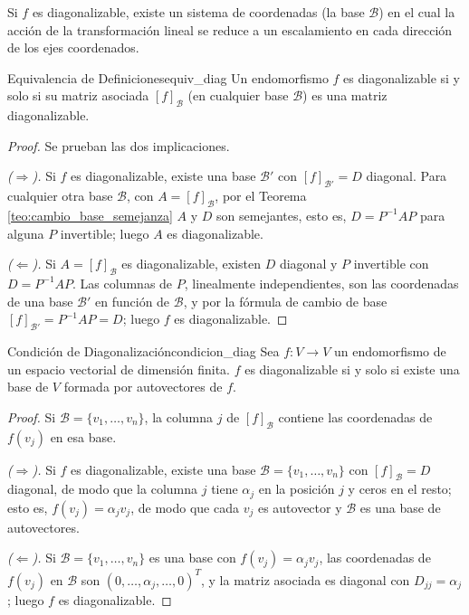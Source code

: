 \documentclass[11pt, a4paper]{article}
\begin{document}
\obs Si $f$ es diagonalizable, existe un sistema de coordenadas (la base $\mathcal{B}$) en el cual la acción de la transformación lineal se reduce a un escalamiento en cada dirección de los ejes coordenados.

\begin{proposicion}{Equivalencia de Definiciones}{equiv_diag}
Un endomorfismo $f$ es diagonalizable si y solo si su matriz asociada $[f]_\mathcal{B}$ (en cualquier base $\mathcal{B}$) es una matriz diagonalizable.
\end{proposicion}

\begin{proof}
Se prueban las dos implicaciones.

\textit{($\Rightarrow$).} Si $f$ es diagonalizable, existe una base $\mathcal{B}'$ con $[f]_{\mathcal{B}'} = D$ diagonal. Para cualquier otra base $\mathcal{B}$, con $A = [f]_\mathcal{B}$, por el Teorema \ref{teo:cambio_base_semejanza} $A$ y $D$ son semejantes, esto es, $D = P^{-1} A P$ para alguna $P$ invertible; luego $A$ es diagonalizable.

\textit{($\Leftarrow$).} Si $A = [f]_\mathcal{B}$ es diagonalizable, existen $D$ diagonal y $P$ invertible con $D = P^{-1} A P$. Las columnas de $P$, linealmente independientes, son las coordenadas de una base $\mathcal{B}'$ en función de $\mathcal{B}$, y por la fórmula de cambio de base $[f]_{\mathcal{B}'} = P^{-1} A P = D$; luego $f$ es diagonalizable.
\end{proof}

\begin{teorema}{Condición de Diagonalización}{condicion_diag}
Sea $f: V \to V$ un endomorfismo de un espacio vectorial de dimensión finita.
$f$ es diagonalizable si y solo si existe una base de $V$ formada por autovectores de $f$.
\end{teorema}

\begin{proof}
Si $\mathcal{B} = \{v_1, \dots, v_n\}$, la columna $j$ de $[f]_\mathcal{B}$ contiene las coordenadas de $f(v_j)$ en esa base.

\textit{($\Rightarrow$).} Si $f$ es diagonalizable, existe una base $\mathcal{B} = \{v_1, \dots, v_n\}$ con $[f]_\mathcal{B} = D$ diagonal, de modo que la columna $j$ tiene $\alpha_j$ en la posición $j$ y ceros en el resto; esto es, $f(v_j) = \alpha_j v_j$, de modo que cada $v_j$ es autovector y $\mathcal{B}$ es una base de autovectores.

\textit{($\Leftarrow$).} Si $\mathcal{B} = \{v_1, \dots, v_n\}$ es una base con $f(v_j) = \alpha_j v_j$, las coordenadas de $f(v_j)$ en $\mathcal{B}$ son $(0, \dots, \alpha_j, \dots, 0)^T$, y la matriz asociada es diagonal con $D_{jj} = \alpha_j$; luego $f$ es diagonalizable.
\end{proof}
\end{document}
